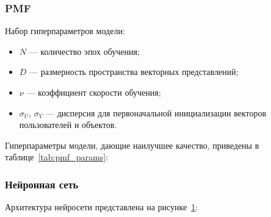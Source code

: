 \subsubsection{PMF}
Набор гиперпараметров модели:
\begin{itemize}
    \item $N$ --- количество эпох обучения;
    \item $D$ --- размерность пространства векторных представлений;
    \item $\nu$ --- коэффициент скорости обучения;
    \item $\sigma_{U}$, $\sigma_{V}$ --- дисперсия для первоначальной инициализации векторов пользователей и объектов.
\end{itemize}

Гиперпараметры модели, дающие наилучшее качество, приведены в таблице~\ref{tab:pmf_params}:
\begin{table}[h]
    \caption{Гиперпараметры PMF}
    \label{tab:pmf_params}
\end{table}

\subsubsection{Нейронная сеть}
Архитектура нейросети представлена на рисунке~\ref{fig:nn_arch}:
\begin{figure}[h!]
\caption{}
\label{fig:nn_arch}
\end{figure}

